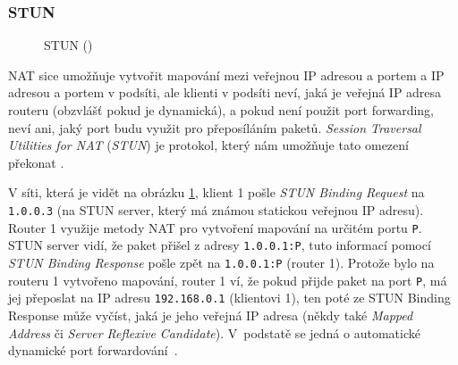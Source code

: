 \subsubsection{STUN}

\begin{figure}[H]
    \centering
    \caption{STUN (\publicPrivateIP)}
    \label{stun}
\end{figure}

NAT sice umožňuje vytvořit mapování mezi veřejnou IP adresou a portem a IP
adresou a portem v podsíti, ale klienti v podsíti neví, jaká je veřejná IP
adresa routeru (obzvlášť pokud je dynamická), a pokud není použit port
forwarding, neví ani, jaký port budu využit pro přeposíláním paketů.
\textit{Session Traversal Utilities for NAT} (\textit{STUN}) je protokol, který
nám umožňuje tato omezení překonat \parencite{WebRTCForTheCurious}.

V síti, která je vidět na obrázku \ref{stun}, klient 1 pošle \textit{STUN
    Binding Request} na \texttt{1.0.0.3} (na STUN server, který má známou
statickou veřejnou IP adresu). Router 1 využije metody NAT pro vytvoření
mapování na určitém portu \texttt{P}. STUN server vidí, že paket
přišel z adresy \texttt{1.0.0.1:P}, tuto informací pomocí \textit{STUN
    Binding Response} pošle zpět na \texttt{1.0.0.1:P} (router 1). Protože
bylo na routeru 1 vytvořeno mapování, router 1 ví, že pokud přijde paket na port
\texttt{P}, má jej přeposlat na IP adresu
\texttt{192.168.0.1} (klientovi 1), ten poté ze STUN Binding Response
může vyčíst, jaká je jeho veřejná IP adresa (někdy také \textit{Mapped Address}
či \textit{Server Reflexive Candidate}). V~podstatě se jedná o automatické
dynamické port forwardování~\parencite{WebRTCForTheCurious}.

